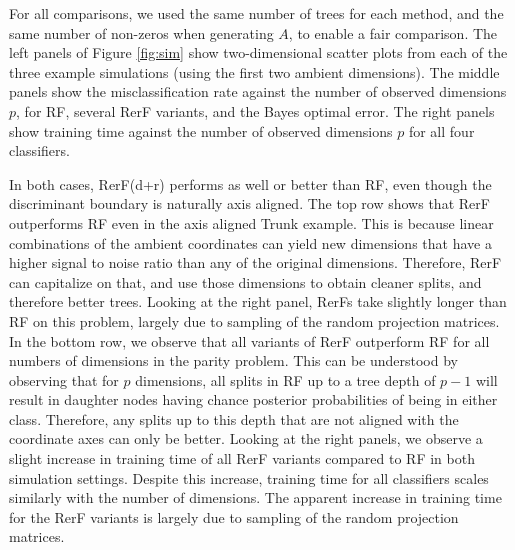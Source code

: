 \documentclass{article} %
\newcommand{\jovo}[1]{{\color{magenta}{\it jovo says: #1}}}
\begin{document}
For all comparisons, we used the same number of trees for each method, and the same number of non-zeros when generating $A$, to enable a fair comparison.   The left panels of Figure \ref{fig:sim} show two-dimensional scatter plots from each of the three example simulations (using the first two ambient dimensions). The middle panels show the misclassification rate against the number of observed dimensions $p$,  for RF, several RerF  variants, and the Bayes optimal error.  The right panels show training time against the number of observed dimensions $p$ for all four classifiers.

In both cases, RerF(d+r) performs as well or better than RF, even though  the discriminant boundary is naturally axis aligned.  
The top row shows that  RerF outperforms RF even in the axis aligned Trunk example.
This is because  linear combinations of the ambient coordinates can yield new dimensions that have a higher signal to noise ratio than any of the original dimensions.  Therefore, RerF can capitalize on that, and use those dimensions to obtain cleaner splits, and therefore better trees.  
Looking at the right panel, RerFs take slightly longer than RF on this problem, largely due to sampling of the random projection matrices. \jovo{still true?}
In the bottom row, we observe that all variants of RerF outperform RF for all numbers of dimensions in the parity problem. This can be understood by observing that for $p$ dimensions, all splits in RF up to a tree depth of $p - 1$ will result in daughter nodes having chance posterior probabilities of being in either class. Therefore, any splits up to this depth that are not aligned with the coordinate axes can only be better. 
Looking at the right panels, we observe a slight increase in training time of all RerF variants compared to RF in both simulation settings. Despite this increase, training time for all classifiers scales similarly with the number of dimensions. The apparent increase in training time for the RerF variants is largely due to sampling of the random projection matrices. 
\end{document}
